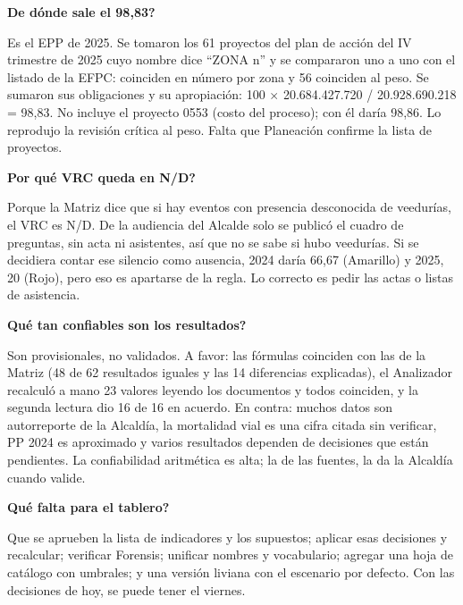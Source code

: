 \documentclass[11pt,letterpaper]{article}
\begin{document}


\textbf{\textquestiondown{}De dónde sale el 98,83?}

Es el EPP de 2025. Se tomaron los 61 proyectos del plan de acción del IV trimestre de 2025 cuyo nombre dice ``ZONA n'' y se compararon uno a uno con el listado de la EFPC: coinciden en número por zona y 56 coinciden al peso. Se sumaron sus obligaciones y su apropiación: 100 $\times$ 20.684.427.720 / 20.928.690.218 = 98,83. No incluye el proyecto 0553 (costo del proceso); con él daría 98,86. Lo reprodujo la revisión crítica al peso. Falta que Planeación confirme la lista de proyectos.


\textbf{\textquestiondown{}Por qué VRC queda en N/D?}

Porque la Matriz dice que si hay eventos con presencia desconocida de veedurías, el VRC es N/D. De la audiencia del Alcalde solo se publicó el cuadro de preguntas, sin acta ni asistentes, así que no se sabe si hubo veedurías. Si se decidiera contar ese silencio como ausencia, 2024 daría 66,67 (Amarillo) y 2025, 20 (Rojo), pero eso es apartarse de la regla. Lo correcto es pedir las actas o listas de asistencia.


\textbf{\textquestiondown{}Qué tan confiables son los resultados?}

Son provisionales, no validados. A favor: las fórmulas coinciden con las de la Matriz (48 de 62 resultados iguales y las 14 diferencias explicadas), el Analizador recalculó a mano 23 valores leyendo los documentos y todos coinciden, y la segunda lectura dio 16 de 16 en acuerdo. En contra: muchos datos son autorreporte de la Alcaldía, la mortalidad vial es una cifra citada sin verificar, PP 2024 es aproximado y varios resultados dependen de decisiones que están pendientes. La confiabilidad aritmética es alta; la de las fuentes, la da la Alcaldía cuando valide.


\textbf{\textquestiondown{}Qué falta para el tablero?}

Que se aprueben la lista de indicadores y los supuestos; aplicar esas decisiones y recalcular; verificar Forensis; unificar nombres y vocabulario; agregar una hoja de catálogo con umbrales; y una versión liviana con el escenario por defecto. Con las decisiones de hoy, se puede tener el viernes.
\end{document}
